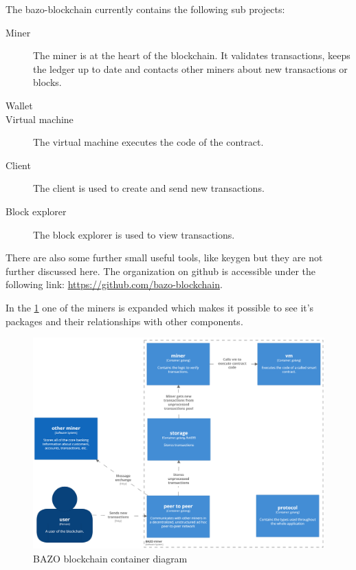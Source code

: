 The bazo-blockchain currently contains the following sub projects:
\begin{description}
  \item[Miner] The miner is at the heart of the blockchain. It validates transactions, keeps the ledger up to date and contacts other miners about new transactions or blocks.
  \item[Wallet] 
  \item[Virtual machine] The virtual machine executes the code of the contract.
  \item[Client] The client is used to create and send new transactions.
  \item[Block explorer] The block explorer is used to view transactions.
\end{description}

There are also some further small useful tools, like keygen but they are not further discussed here. The organization on github is accessible under the following link: \href{https://github.com/bazo-blockchain}{https://github.com/bazo-blockchain}.

In the \ref{systemcontainerdiagram} one of the miners is expanded which makes it possible to see it's packages and their relationships with other components.
\begin{figure}[H]
	\begin{center}
	\includegraphics[width=\textwidth]{./images/BAZO_Container}
	\caption{BAZO blockchain container diagram}
	\label{systemcontainerdiagram}
	\end{center}
\end{figure}
\pagebreak

